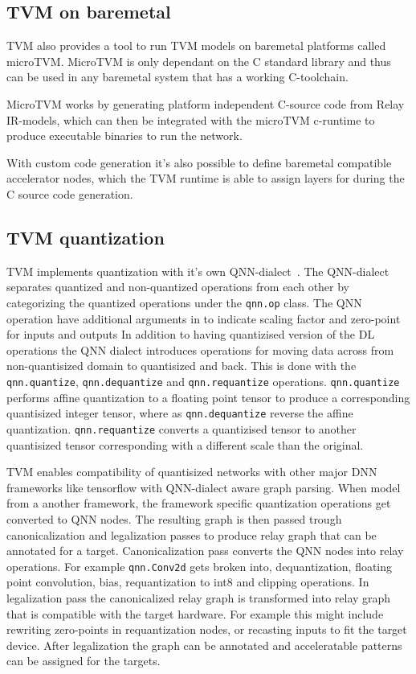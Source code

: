 \documentclass[12pt,a4paper,english
]{tunithesis}
\begin{document}
\subsection{TVM on baremetal}
TVM also provides a tool to run TVM models on baremetal platforms called microTVM. MicroTVM is only dependant on the C standard library and thus can be used in any baremetal system that has a working C-toolchain.

MicroTVM works by generating platform independent C-source code from Relay IR-models, which can then be integrated with the microTVM c-runtime to produce executable binaries to run the network.

With custom code generation it's also possible to define baremetal compatible accelerator nodes, which the TVM runtime is able to assign layers for during the C source code generation.~\parencite{TVM}

\subsection{TVM quantization}
TVM implements quantization with it's own QNN-dialect~\cite{jain_efficient_2020}. The QNN-dialect separates quantized and non-quantized operations from each other by categorizing the quantized operations under the \texttt{qnn.op} class. The QNN operation have additional arguments in to indicate scaling factor and zero-point for inputs and outputs
 In addition to having quantizised version of the DL operations the QNN dialect introduces operations for moving data across from non-quantisized domain to quantisized and back. This is done with the \texttt{qnn.quantize}, \texttt{qnn.dequantize} and \texttt{qnn.requantize} operations. \texttt{qnn.quantize} performs affine quantization to a floating point tensor to produce a corresponding quantisized integer tensor, where as \texttt{qnn.dequantize} reverse the affine quantization. \texttt{qnn.requantize} converts a quantizised tensor to another quantisized tensor corresponding with a different scale than the original.

TVM enables compatibility of quantisized networks with other major DNN frameworks like tensorflow with QNN-dialect aware graph parsing. When model from a another framework, the framework specific quantization operations get converted to QNN nodes. The resulting graph is then passed trough canonicalization and legalization passes to produce relay graph that can be annotated for a target.
Canonicalization pass converts the QNN nodes into relay operations. For example \texttt{qnn.Conv2d} gets broken into, dequantization, floating point convolution, bias, requantization to int8 and clipping operations.
In legalization pass the canonicalized relay graph is transformed into relay graph that is compatible with the target hardware. For example this might include rewriting zero-points in requantization nodes, or recasting inputs to fit the target device.
After legalization the graph can be annotated and acceleratable patterns can be assigned for the targets.
\end{document}
